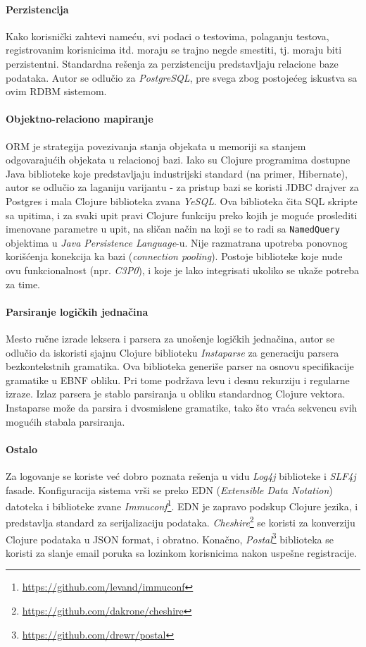 \paragraph{Perzistencija}
Kako korisnički zahtevi nameću, svi podaci o testovima, polaganju testova, registrovanim korisnicima itd. moraju se trajno negde smestiti, tj. moraju biti perzistentni. Standardna rešenja za perzistenciju predstavljaju relacione baze podataka. Autor se odlučio za \emph{PostgreSQL}\cite{postgres}, pre svega zbog postojećeg iskustva sa ovim RDBM sistemom.

\paragraph{Objektno-relaciono mapiranje}
ORM je strategija povezivanja stanja objekata u memoriji sa stanjem odgovarajućih objekata u relacionoj bazi. Iako su Clojure programima dostupne Java biblioteke koje predstavljaju industrijski standard (na primer, Hibernate), autor se odlučio za laganiju varijantu - za pristup bazi se koristi JDBC drajver za Postgres i mala Clojure biblioteka zvana \emph{YeSQL}\cite{yesql}. Ova biblioteka čita SQL skripte sa upitima, i za svaki upit pravi Clojure funkciju preko kojih je moguće proslediti imenovane parametre u upit, na sličan način na koji se to radi sa \texttt{NamedQuery} objektima u \textit{Java Persistence Language}-u. Nije razmatrana upotreba ponovnog korišćenja konekcija ka bazi (\textit{connection pooling}). Postoje biblioteke koje nude ovu funkcionalnost (npr. \emph{C3P0}), i koje je lako integrisati ukoliko se ukaže potreba za time.

\paragraph{Parsiranje logičkih jednačina} Mesto ručne izrade leksera i parsera za unošenje logičkih jednačina, autor se odlučio da iskoristi sjajnu Clojure biblioteku \emph{Instaparse}\cite{instaparse} za generaciju parsera bezkontekstnih gramatika. Ova biblioteka generiše parser na osnovu specifikacije gramatike u EBNF obliku. Pri tome podržava levu i desnu rekurziju i regularne izraze. Izlaz parsera je stablo parsiranja u obliku standardnog Clojure vektora. Instaparse može da parsira i dvosmislene gramatike, tako što vraća sekvencu svih mogućih stabala parsiranja.

\paragraph{Ostalo} Za logovanje se koriste već dobro poznata rešenja u vidu \emph{Log4j} biblioteke i \emph{SLF4j} fasade. Konfiguracija sistema vrši se preko EDN (\textit{Extensible Data Notation}) datoteka i biblioteke zvane \emph{Immuconf}\footnote{\url{https://github.com/levand/immuconf}}. EDN je zapravo podskup Clojure jezika, i predstavlja standard za serijalizaciju podataka. \textit{Cheshire}\footnote{\url{https://github.com/dakrone/cheshire}} se koristi za konverziju Clojure podataka u JSON format, i obratno. Konačno, \textit{Postal}\footnote{\url{https://github.com/drewr/postal}} biblioteka se koristi za slanje email poruka sa lozinkom korisnicima nakon uspešne registracije.

